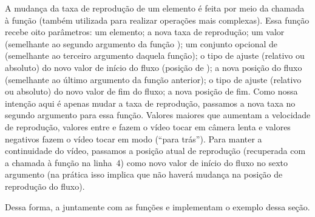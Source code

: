 A mudança da taxa de reprodução de um elemento é feita por meio da chamada à
função  (também utilizada para realizar operações 
 mais complexas). Essa função recebe oito parâmetros: um elemento;
a nova taxa de reprodução; um valor  (semelhante ao segundo
argumento da função ); um conjunto opcional de 
 (semelhante ao terceiro argumento daquela função); o tipo de
ajuste (relativo ou absoluto) do novo valor de início do fluxo (posição
de ); a nova posição do fluxo (semelhante ao último argumento da
função anterior); o tipo de ajuste (relativo ou absoluto) do novo valor de fim
do fluxo; a nova posição de fim. Como nossa intenção aqui é apenas mudar a taxa
de reprodução, passamos a nova taxa no segundo argumento para essa função. 
Valores maiores que  aumentam a velocidade de reprodução, valores entre
 e  fazem o vídeo tocar em câmera lenta e valores negativos fazem
o vídeo tocar em modo  (``para trás'').
Para manter a continuidade do vídeo, passamos a posição atual de reprodução
(recuperada com a chamada à função  na linha~4)
como novo valor de início do fluxo no sexto argumento (na prática isso implica
que não haverá mudança na posição de reprodução do fluxo). 

Dessa forma, a   juntamente com as funções 
e  implementam o exemplo dessa seção.
